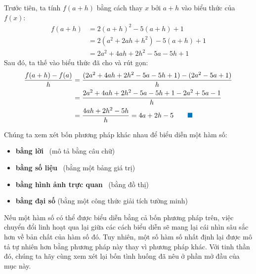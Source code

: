 \documentclass[10pt,letterpaper]{article}
\begin{document}
\begin{minipage}[t]{0.71\textwidth}
    \vspace{0.15cm}
    \quad Trước tiên, ta tính $f(a + h)$ bằng cách thay $x$ bởi $a + h$ vào biểu thức của $f(x)$:
    \begin{align*}
    f(a + h) &= 2(a + h)^2 - 5(a + h) + 1 \\
    &= 2(a^2 + 2ah + h^2) - 5(a + h) + 1 \\
    &= 2a^2 + 4ah + 2h^2 - 5a - 5h + 1
    \end{align*}
    Sau đó, ta thế vào biểu thức đã cho và rút gọn:
    \begin{align*}
    \frac{f(a + h) - f(a)}{h} &= \frac{(2a^2 + 4ah + 2h^2 - 5a - 5h + 1) - (2a^2 - 5a + 1)}{h} \\
    &= \frac{2a^2 + 4ah + 2h^2 - 5a - 5h + 1 - 2a^2 + 5a - 1}{h} \\
    &= \frac{4ah + 2h^2 - 5h}{h} = 4a + 2h - 5 \qquad {\color{stewartcyan}\blacksquare}
    \end{align*}

    \vspace{0.2cm}
    \vspace{0.15cm}

    Chúng ta xem xét bốn phương pháp khác nhau để biểu diễn một hàm số:
    \begin{itemize}[itemsep=0.08cm, topsep=0.1cm]
        \item[{\color{stewartred}\textbullet}] \textbf{bằng lời} \qquad\qquad\quad\ (mô tả bằng câu chữ)
        \item[{\color{stewartred}\textbullet}] \textbf{bằng số liệu} \qquad\qquad\ (bằng một bảng giá trị)
        \item[{\color{stewartred}\textbullet}] \textbf{bằng hình ảnh trực quan} \ (bằng đồ thị)
        \item[{\color{stewartred}\textbullet}] \textbf{bằng đại số} \qquad\qquad (bằng một công thức giải tích tường minh)
    \end{itemize}

    Nếu một hàm số có thể được biểu diễn bằng cả bốn phương pháp trên, việc chuyển đổi linh hoạt qua lại giữa các cách biểu diễn sẽ mang lại cái nhìn sâu sắc hơn về bản chất của hàm số đó. Tuy nhiên, một số hàm số nhất định lại được mô tả tự nhiên hơn bằng phương pháp này thay vì phương pháp khác. Với tinh thần đó, chúng ta hãy cùng xem xét lại bốn tình huống đã nêu ở phần mở đầu của mục này.
\end{minipage}
\end{document}
